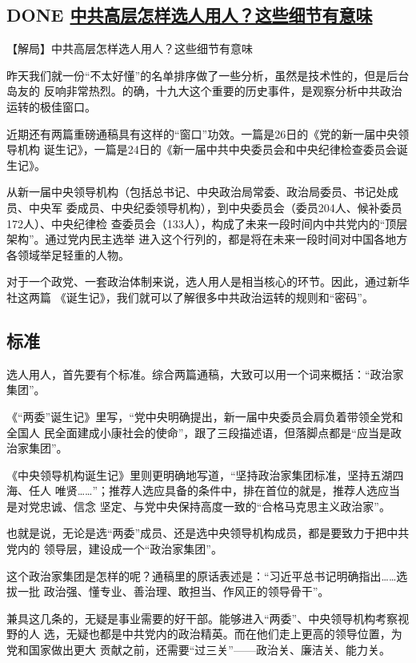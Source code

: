 \documentclass[11pt]{ctexart}
\begin{document}
{{{{\subsection{{\bfseries\sffamily DONE} \href{http://news.ifeng.com/a/20171028/52827456\_0.shtml}{中共高层怎样选人用人？这些细节有意味}}
\label{sec:org442298e}
【解局】中共高层怎样选人用人？这些细节有意味

昨天我们就一份“不太好懂”的名单排序做了一些分析，虽然是技术性的，但是后台岛友的
反响非常热烈。的确，十九大这个重要的历史事件，是观察分析中共政治运转的极佳窗口。

近期还有两篇重磅通稿具有这样的“窗口”功效。一篇是26日的《党的新一届中央领导机构
诞生记》，一篇是24日的《新一届中共中央委员会和中央纪律检查委员会诞生记》。

从新一届中央领导机构（包括总书记、中央政治局常委、政治局委员、书记处成员、中央军
委成员、中央纪委领导机构），到中央委员会（委员204人、候补委员172人）、中央纪律检
查委员会（133人），构成了未来一段时间内中共党内的“顶层架构”。通过党内民主选举
进入这个行列的，都是将在未来一段时间对中国各地方各领域举足轻重的人物。

对于一个政党、一套政治体制来说，选人用人是相当核心的环节。因此，通过新华社这两篇
《诞生记》，我们就可以了解很多中共政治运转的规则和“密码”。

\subsection{标准}
\label{sec:orgc457b85}

选人用人，首先要有个标准。综合两篇通稿，大致可以用一个词来概括：“政治家集团”。

《“两委”诞生记》里写，“党中央明确提出，新一届中央委员会肩负着带领全党和全国人
民全面建成小康社会的使命”，跟了三段描述语，但落脚点都是“应当是政治家集团”。

《中央领导机构诞生记》里则更明确地写道，“坚持政治家集团标准，坚持五湖四海、任人
唯贤……”；推荐人选应具备的条件中，排在首位的就是，推荐人选应当是对党忠诚、信念
坚定、与党中央保持高度一致的“合格马克思主义政治家”。

也就是说，无论是选“两委”成员、还是选中央领导机构成员，都是要致力于把中共党内的
领导层，建设成一个“政治家集团”。

这个政治家集团是怎样的呢？通稿里的原话表述是：“习近平总书记明确指出……选拔一批
政治强、懂专业、善治理、敢担当、作风正的领导骨干”。

兼具这几条的，无疑是事业需要的好干部。能够进入“两委”、中央领导机构考察视野的人
选，无疑也都是中共党内的政治精英。而在他们走上更高的领导位置，为党和国家做出更大
贡献之前，还需要“过三关”——政治关、廉洁关、能力关。



}}}}
\end{document}
